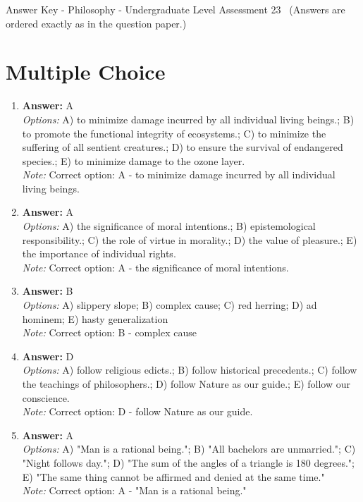 \documentclass[12pt]{article}
\begin{document}
\begin{center}
Answer Key - Philosophy - Undergraduate Level Assessment 23 \
\small (Answers are ordered exactly as in the question paper.)
\end{center}

\section*{Multiple Choice}
\begin{enumerate}[label=\arabic*.]
\item \textbf{Answer:} A
\\ \textit{Options:} A) to minimize damage incurred by all individual living beings.; B) to promote the functional integrity of ecosystems.; C) to minimize the suffering of all sentient creatures.; D) to ensure the survival of endangered species.; E) to minimize damage to the ozone layer.
\\ \textit{Note:} Correct option: A - to minimize damage incurred by all individual living beings.
\item \textbf{Answer:} A
\\ \textit{Options:} A) the significance of moral intentions.; B) epistemological responsibility.; C) the role of virtue in morality.; D) the value of pleasure.; E) the importance of individual rights.
\\ \textit{Note:} Correct option: A - the significance of moral intentions.
\item \textbf{Answer:} B
\\ \textit{Options:} A) slippery slope; B) complex cause; C) red herring; D) ad hominem; E) hasty generalization
\\ \textit{Note:} Correct option: B - complex cause
\item \textbf{Answer:} D
\\ \textit{Options:} A) follow religious edicts.; B) follow historical precedents.; C) follow the teachings of philosophers.; D) follow Nature as our guide.; E) follow our conscience.
\\ \textit{Note:} Correct option: D - follow Nature as our guide.
\item \textbf{Answer:} A
\\ \textit{Options:} A) "Man is a rational being."; B) "All bachelors are unmarried."; C) "Night follows day."; D) "The sum of the angles of a triangle is 180 degrees."; E) "The same thing cannot be affirmed and denied at the same time."
\\ \textit{Note:} Correct option: A - "Man is a rational being."
\end{enumerate}
\end{document}
